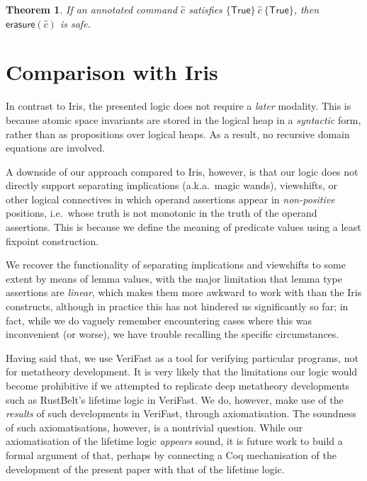 \documentclass{article}
\newtheorem{theorem}{Theorem}
\begin{document}
\begin{theorem}
If an annotated command $\hat{c}$ satisfies $\{\mathsf{True}\}\ \hat{c}\ \{\mathsf{True}\}$, then $\mathsf{erasure}(\hat{c})$ is safe.
\end{theorem}

\section{Comparison with Iris}

In contrast to Iris, the presented logic does not require a \emph{later} modality. This is because atomic space invariants are stored in the logical heap in a \emph{syntactic} form, rather than as propositions over logical heaps. As a result, no recursive domain equations are involved.

A downside of our approach compared to Iris, however, is that our logic does not directly support separating implications (a.k.a.~magic wands), viewshifts, or other logical connectives in which operand assertions appear in \emph{non-positive} positions, i.e.~whose truth is not monotonic in the truth of the operand assertions. This is because we define the meaning of predicate values using a least fixpoint construction.

We recover the functionality of separating implications and viewshifts to some extent by means of lemma values, with the major limitation that lemma type assertions are \emph{linear}, which makes them more awkward to work with than the Iris constructs, although in practice this has not hindered us significantly so far; in fact, while we do vaguely remember encountering cases where this was inconvenient (or worse), we have trouble recalling the specific circumstances.

Having said that, we use VeriFast as a tool for verifying particular programs, not for metatheory development. It is very likely that the limitations our logic would become prohibitive if we attempted to replicate deep metatheory developments such as RustBelt's lifetime logic \cite{rustbelt} in VeriFast. We do, however, make use of the \emph{results} of such developments in VeriFast, through axiomatisation. The soundness of such axiomatisations, however, is a nontrivial question. While our axiomatisation of the lifetime logic \emph{appears} sound, it is future work to build a formal argument of that, perhaps by connecting a Coq mechanisation of the development of the present paper with that of the lifetime logic.



\end{document}
